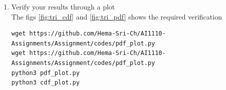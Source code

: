 \documentclass[journal,12pt,twocolumn]{article}
\renewcommand\thesection{\arabic{section}}
\begin{document}
\begin{enumerate}[label=\thesection.\arabic*
,ref=\thesection.\theenumi]
\begin{align}
	&= 0
\end{align}
For $0 < t < 1$,
\begin{align}
	F_T(x) &= \int_{-\infty}^{x} p_T(t) \, dt \\
	&= \int_{-\infty}^{0} 0 \, dt  + \int_{0}^{x} t \, dt\\
	&= 0 + \frac{t^2}{2}|_{0}^{x} \\
	&= \frac{x^2}{2}
\end{align}
For $1 < t < 2$,
\begin{align}
	F_T(x) &= \int_{-\infty}^{x} p_T(t) \, dt \\
	&= \int_{-\infty}^{0} 0 \, dt  + \int_{0}^{1} t \, dt + \int_{1}^{x} 2-t \, dt\\
	&= 0 + \frac{t^2}{2}|_{0}^{1} + [2t - t^2/2]_{1}^{x}\\
	&= -\frac{x^2}{2} + 2x - 1
\end{align}
For $t > 2$
\begin{align}
	F_T(x) &= \int_{-\infty}^{x} p_T(t) \, dt \\
	&= \int_{0}^{1} t \, dt + \int_{1}^{2} 2-t \, dt \\
	&= 0 + \frac{t^2}{2}|_{0}^{1} + [2t - t^2/2]_{1}^{2}\\
	&= 1
\end{align}
Hence the CDF of T is given s follows,
\begin{align}
	F_T(x) &= \begin{cases} 0 &, 0 < x \\
	\frac{x^2}{2} &, 0 < x \leq 1 \\
	-\frac{x^2}{2} + 2x - 1 &, 1 < x \leq 2 \\
	1 &, x > 2 \end{cases} 
\end{align}

\item
Verify your results through a plot
\\
\solution
The figs \ref{fig:tri_cdf} and \ref{fig:tri_pdf} shows the required verification
\begin{lstlisting}
wget https://github.com/Hema-Sri-Ch/AI1110-Assignments/Assignment/codes/pdf_plot.py
wget https://github.com/Hema-Sri-Ch/AI1110-Assignments/Assignment/codes/pdf_plot.py
python3 pdf_plot.py
python3 cdf_plot.py
\end{lstlisting}
\end{enumerate}
\end{document}
